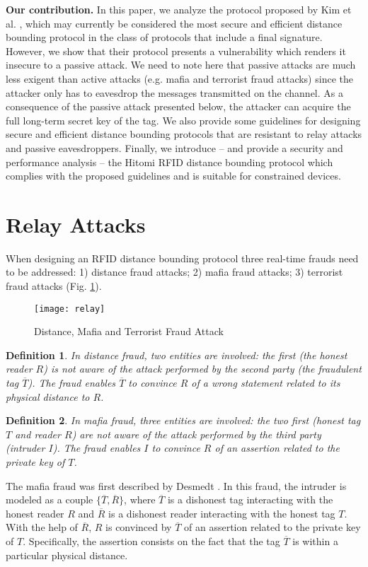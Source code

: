 \documentclass{article}
\newtheorem{definition}{Definition}
\begin{document}
\textbf{Our contribution.} In this paper, we analyze the protocol proposed by Kim et al. \cite{KimAKSP-2008-icisc}, which may currently be considered the most secure and efficient distance bounding protocol in the class of protocols that include a final signature. However, we show that their protocol presents a vulnerability which renders it insecure to a passive attack. We need to note here that passive attacks are much less exigent than active attacks (e.g. mafia and terrorist fraud attacks) since the attacker only has to eavesdrop the messages transmitted on the channel. As a consequence of the passive attack presented below,  the attacker can acquire the full long-term secret key of the tag. We also provide some guidelines for designing secure and efficient distance bounding protocols that are resistant to relay attacks and passive eavesdroppers. Finally, we introduce -- and provide a security and performance analysis --  the Hitomi RFID distance bounding protocol which complies with the proposed guidelines and is suitable for constrained devices.

\section{Relay Attacks}

When designing an RFID distance bounding protocol three real-time frauds \cite{Bussard-2004-thesis,BussardB05} need to be addressed: 1) distance fraud attacks; 2) mafia fraud attacks; 3) terrorist fraud attacks (Fig. \ref{fig::relay}).

\begin{figure}
\centering
\texttt{[image: relay]}\\
\caption{Distance, Mafia and Terrorist Fraud Attack }
\label{fig::relay}
\end{figure}



\begin{definition}
In distance fraud, two entities are involved: the first (the honest reader $R$) is not aware of the attack performed by the second party (the fraudulent tag $\overline{T}$).  The fraud enables $\overline{T}$ to convince $R$ of a wrong statement related to its physical distance to $R$.
\end{definition}

\begin{definition}
In mafia fraud, three entities are involved: the two first (honest tag $T$ and reader $R$) are not aware of the attack performed by the third party (intruder $I$). The fraud enables $I$ to convince $R$ of an assertion related to the private key of $T$.
\end{definition}
The mafia fraud was first described by Desmedt \cite{desmedt}. In this fraud, the intruder is modeled as a couple $\{\overline{T}, \overline{R}\}$, where $\overline{T}$ is a dishonest tag interacting with the honest reader $R$ and  $\overline{R}$ is a dishonest reader interacting with the honest tag $T$. With the help of $\overline{R}$, $R$ is convinced by $\overline{T}$ of an assertion related to the private key of $T$. Specifically, the assertion consists on the fact that the tag $\overline{T}$ is within a particular physical distance.
\end{document}
